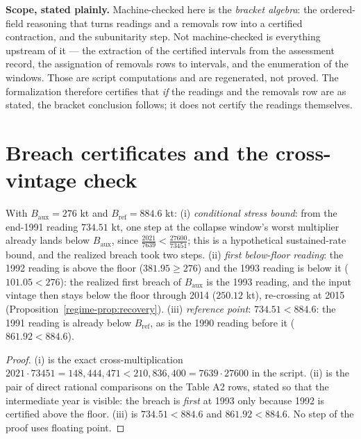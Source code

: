 \noindent\textbf{Scope, stated plainly.} Machine-checked here is the \emph{bracket algebra}:
the ordered-field reasoning that turns readings and a removals row into a certified
contraction, and the subunitarity step. Not machine-checked is everything upstream of it ---
the extraction of the certified intervals from the assessment record, the assignation of
removals rows to intervals, and the enumeration of the windows. Those are script computations
and are regenerated, not proved. The formalization therefore certifies that \emph{if} the
readings and the removals row are as stated, the bracket conclusion follows; it does not
certify the readings themselves.

\section{Breach certificates and the cross-vintage check}\label{regime-breach}

\begin{proposition}
\label{regime-prop:breach}
With \(B_{\mathrm{aux}} = 276\) kt and \(B_{\mathrm{ref}} = 884.6\)
kt: (i) \emph{conditional stress bound}: from the end-1991 reading
\(734.51\) kt, one step at the collapse window's worst multiplier
already lands below \(B_{\mathrm{aux}}\), since
\(\tfrac{2021}{7639} < \tfrac{27600}{73451}\); this is a hypothetical
sustained-rate bound, and the realized breach took two steps.
(ii) \emph{first below-floor reading}: the 1992 reading is above the
floor (\(381.95 \ge 276\)) and the 1993 reading is below it
(\(101.05 < 276\)): the realized first breach of \(B_{\mathrm{aux}}\)
is the 1993 reading, and the input vintage then stays below the floor
through 2014 (\(250.12\) kt), re-crossing at 2015
(Proposition~\ref{regime-prop:recovery}). (iii) \emph{reference point}:
\(734.51 < 884.6\): the 1991 reading is already below
\(B_{\mathrm{ref}}\), as is the 1990 reading before it
(\(861.92 < 884.6\)).
\end{proposition}

\begin{proof}
(i) is the exact cross-multiplication
\(2021 \cdot 73451 = 148{,}444{,}471 < 210{,}836{,}400 = 7639 \cdot
27600\) in the script. (ii) is the pair of direct rational comparisons
on the Table A2 rows, stated so that the intermediate year is visible:
the breach is \emph{first} at 1993 only because 1992 is certified
above the floor. (iii) is \(734.51 < 884.6\) and \(861.92 < 884.6\).
No step of the proof uses floating point.
\end{proof}

